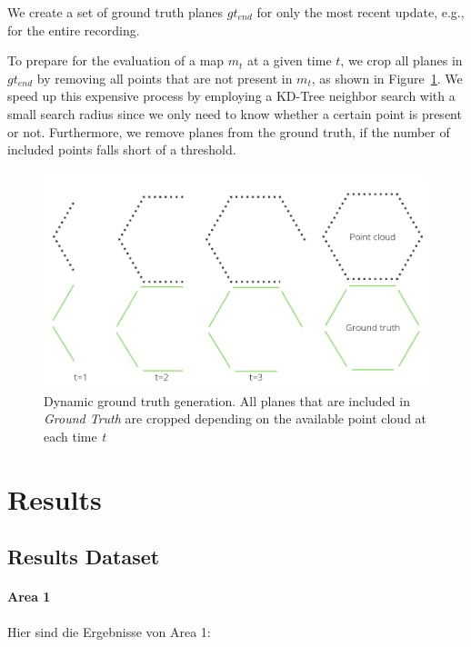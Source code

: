 \documentclass[main.tex]{subfiles}
\begin{document}
We create a set of ground truth planes $gt_{end}$ for only the most recent update, e.g., for the entire recording.

To prepare for the evaluation of a map $m_t$ at a given time $t$, we crop all planes in $gt_{end}$ by removing all points that are not present in $m_t$, as shown in 
Figure~\ref{fig:dynGT}. 
We speed up this expensive process by employing a KD-Tree neighbor search with a small search radius since we only need to know whether a certain point is present or not. 
Furthermore, we remove planes from the ground truth, if the number of included points falls short of a threshold.

\begin{figure}[!ht]
	\centering
	\includegraphics[width=15 cm]{images/dynamic_eval.png}
    \caption[Dynamic Ground Truth Generation]{Dynamic ground truth generation. All planes that are included in \textit{Ground Truth} are cropped depending on 
    the available point cloud at each time \textit{t} }
    \label{fig:dynGT}
\end{figure}


\section{Results}

\subsection{Results Dataset}


\paragraph*{Area 1}
Hier sind die Ergebnisse von Area 1:
\end{document}
